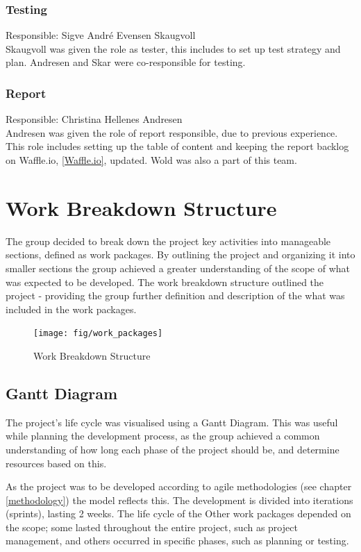 \subsubsection{Testing}
Responsible: Sigve André Evensen Skaugvoll\\
Skaugvoll was given the role as tester, this includes to set up test strategy and plan. Andresen and Skar were co-responsible for testing. 

\subsubsection{Report}
Responsible: Christina Hellenes Andresen\\
Andresen was given the role of report responsible, due to previous experience. This role includes setting up the table of content and keeping the report backlog on Waffle.io, \ref{Waffle.io}, updated. Wold was also a part of this team.


\section{Work Breakdown Structure}
The group decided to break down the project key activities into manageable sections, defined as work packages. By outlining the project and organizing it into smaller sections the group achieved a greater understanding of the scope of what was expected to be developed. The work breakdown structure outlined the project - providing the group further definition and description of the what was included in the work packages. 

\begin{figure}[h!]
\centering
    \texttt{[image: fig/work\_packages]}
\caption{Work Breakdown Structure}
\end{figure}

\subsection{Gantt Diagram} 
The project's life cycle was visualised using a Gantt Diagram. This was useful while planning the development process, as the group achieved a common understanding of how long each phase of the project should be, and determine resources based on this. 

As the project was to be developed according to agile methodologies (see chapter \ref{methodology}) the model reflects this. The development is divided into iterations (sprints), lasting 2 weeks. The life cycle of the Other work packages depended on the scope; some lasted throughout the entire project, such as project management, and others occurred in specific phases, such as planning or testing. 

